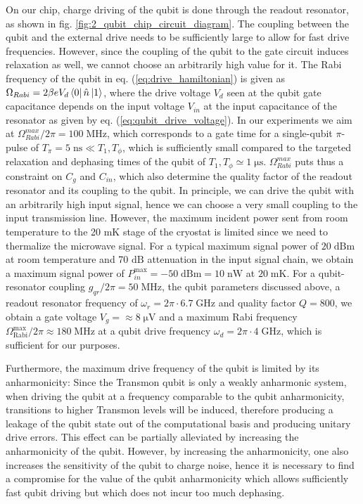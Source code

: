 On our chip, charge driving of the qubit is done through the readout resonator, as shown in fig. \ref{fig:2_qubit_chip_circuit_diagram}. The coupling between the qubit and the external drive needs to be sufficiently large to allow for fast drive frequencies. However, since the coupling of the qubit to the gate circuit induces relaxation as well, we cannot choose an arbitrarily high value for it. The Rabi frequency of the qubit in eq. (\ref{eq:drive_hamiltonian}) is given as $\Omega_{Rabi}= 2 \beta e V_d \left< 0 \right|\hat{n}\left| 1 \right>$, where the drive voltage $V_d$ seen at the qubit gate capacitance depends on the input voltage $V_{in}$ at the input capacitance of the resonator as given by eq. (\ref{eq:qubit_drive_voltage}). In our experiments we aim at $\Omega_{Rabi}^{max}/2\pi=100\;\mathrm{MHz}$, which corresponds to a gate time for a single-qubit $\pi$-pulse of $T_\pi=5\;\mathrm{ns}\ll T_1,T_\phi$, which is sufficiently small compared to the targeted relaxation and dephasing times of the qubit of $T_1,T_\phi\simeq 1\;\mathrm{\mu s}$. $\Omega_{Rabi}^{max}$ puts thus a constraint on $C_{g}$ and $C_{in}$, which also determine the quality factor of the readout resonator and its coupling to the qubit. In principle, we can drive the qubit with an arbitrarily high input signal, hence we can choose a very small coupling to the input transmission line. However, the maximum incident power sent from room temperature to the 20 mK stage of the cryostat is limited since we need to thermalize the microwave signal. For a typical maximum signal power of $20 \; \mathrm{dBm}$ at room temperature and 70 $\mathrm{dB}$ attenuation in the input signal chain, we obtain a maximum signal power of $P_{in}^{\mathrm{max}}=-50\;\mathrm{dBm}=10\;\mathrm{nW}$ at $20\;\mathrm{mK}$. For a qubit-resonator coupling $g_{qr}/2\pi=50\;\mathrm{MHz}$, the qubit parameters discussed above, a readout resonator frequency of $\omega_r=2\pi \cdot 6.7\;\mathrm{GHz}$ and quality factor $Q=800$, we obtain a gate voltage $V_g=\approx 8\;\mathrm{\mu V}$ and a maximum Rabi frequency $\Omega_{\mathrm{Rabi}}^{\mathrm{max}}/2\pi\approx 180\;\mathrm{MHz}$ at a qubit drive frequency $\omega_d=2\pi \cdot 4\;\mathrm{GHz}$, which is sufficient for our purposes.

\smallskip	

Furthermore, the maximum drive frequency of the qubit is limited by its anharmonicity: Since the Transmon qubit is only a weakly anharmonic system, when driving the qubit at a frequency comparable to the qubit anharmonicity, transitions to higher Transmon levels will be induced, therefore producing a leakage of the qubit state out of the computational basis and producing unitary drive errors. This effect can be partially alleviated by increasing the anharmonicity of the qubit. However, by increasing the anharmonicity, one also increases the sensitivity of the qubit to charge noise, hence it is necessary to find a compromise for the value of the qubit anharmonicity which allows sufficiently fast qubit driving but which does not incur too much dephasing.

